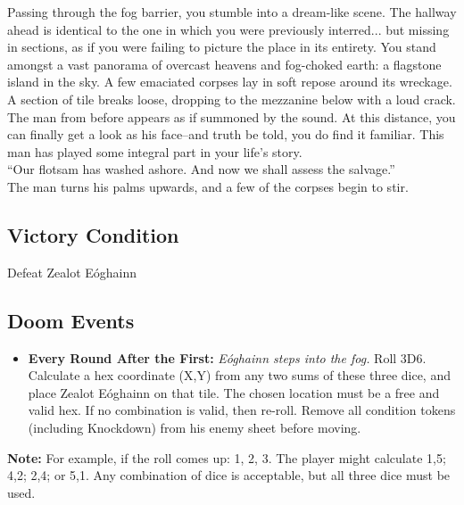 Passing through the fog barrier, you stumble into a dream-like scene. The hallway ahead is identical to the one in which you were previously interred... but missing in sections, as if you were failing to picture the place in its entirety. You stand amongst a vast panorama of overcast heavens and fog-choked earth: a flagstone island in the sky. A few emaciated corpses lay in soft repose around its wreckage.\\

A section of tile breaks loose, dropping to the mezzanine below with a loud crack.\\

The man from before appears as if summoned by the sound. At this distance, you can finally get a look as his face--and truth be told, you do find it familiar. This man has played some integral part in your life’s story.\\

“Our flotsam has washed ashore. And now we shall assess the salvage.”\\

The man turns his palms upwards, and a few of the corpses begin to stir.\\

\subsection*{Victory Condition}
Defeat Zealot Eóghainn

\subsection*{Doom Events}
\begin{itemize}
\item \textbf{Every Round After the First:} \emph{Eóghainn steps into the fog.} Roll 3D6. Calculate a hex coordinate (X,Y) from any two sums of these three dice, and place Zealot Eóghainn on that tile. The chosen location must be a free and valid hex. If no combination is valid, then re-roll. Remove all condition tokens (including Knockdown) from his enemy sheet before moving.
\end{itemize}

\begin{tcolorbox}
\textbf{Note:} For example, if the roll comes up: 1, 2, 3. The player might calculate 1,5; 4,2; 2,4; or 5,1. Any combination of dice is acceptable, but all three dice must be used.
\end{tcolorbox}

